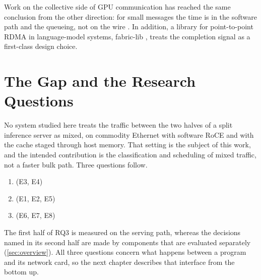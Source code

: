 Work on the collective side of GPU communication has reached the same
conclusion from the other direction: for small messages the time is in the
software path and the queueing, not on the wire \citep{shen2026sol}. In addition, a library for point-to-point RDMA in language-model systems,
fabric-lib \citep{licker2026fabriclib}, treats the completion signal as a first-class design choice.

\section{The Gap and the Research Questions}
\label{sec:rq}

No system studied here treats the traffic between the two halves of a split
inference server as mixed, on commodity Ethernet with software RoCE and with the cache staged through host memory. That
setting is the subject of this work, and the intended contribution is the
classification and scheduling of mixed traffic, not a faster bulk path.
Three questions follow.

\begin{enumerate}
  \item[RQ1.] \rqone{} (E3, E4)
  \item[RQ2.] \rqtwo{} (E1, E2, E5)
  \item[RQ3.] \rqthree{} (E6, E7, E8)
\end{enumerate}

The first half of RQ3 is measured on the serving path, whereas the decisions
named in its second half are made by components that are evaluated
separately (\cref{sec:overview}). All three questions concern what happens
between a program and its network card, so the next chapter describes that
interface from the bottom up.
